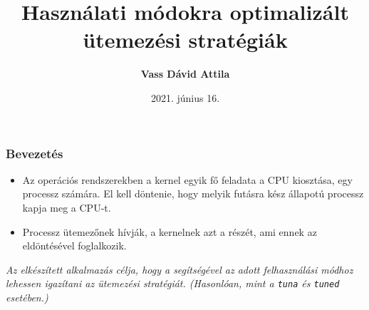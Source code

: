 \documentclass{beamer}
\title[Használati módokra optimalizált ütemezési stratégiák]{Használati módokra optimalizált \\ ütemezési stratégiák}
\author[Vass Dávid Attila]{\textbf{Vass Dávid Attila}}
\institute[]{Miskolci Egyetem, Alkalmazott Matematikai Intézeti Tanszék}
\date{2021. június 16.}
\begin{document}
\begin{frame}
\maketitle
\end{frame}

\begin{frame}
\frametitle{Bevezetés}
\begin{itemize}


\item Az operációs rendszerekben a kernel egyik fő feladata a CPU kiosztása, egy processz számára. El kell döntenie, hogy melyik futásra kész állapotú processz kapja meg a CPU-t.
\item Processz ütemezőnek hívják, a kernelnek azt a részét, ami ennek az eldöntésével foglalkozik.
\end{itemize}

\bigskip

\emph{Az elkészített alkalmazás célja, hogy a segítségével az adott felhasználási módhoz lehessen igazítani az ütemezési stratégiát. (Hasonlóan, mint a \texttt{tuna} és \texttt{tuned} esetében.)}

\end{frame}
\end{document}
